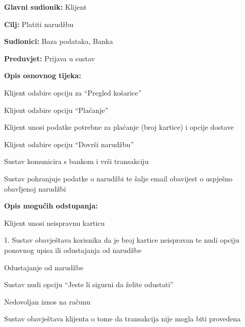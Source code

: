 				\noindent {}
				\begin{packed_item}
					
					\item \textbf{Glavni sudionik: } Klijent
					\item  \textbf{Cilj:} Platiti narudžbu 
					\item  \textbf{Sudionici:} Baza podataka, Banka
					\item  \textbf{Preduvjet:}  Prijava u sustav
					\item  \textbf{Opis osnovnog tijeka:}
					
					\item[] \begin{packed_enum}
						\item Klijent odabire opciju za “Pregled košarice”
						\item Klijent odabire opciju “Plaćanje”
						\item Klijent unosi podatke potrebne za plaćanje (broj kartice) i opcije dostave
						\item Klijent odabire opciju “Dovrši narudžbu”
						\item Sustav komunicira s bankom i vrši transakciju
						\item Sustav pohranjuje podatke o narudžbi te šalje email obavijest o uspješno obavljenoj narudžbi
					\end{packed_enum}
					\item  \textbf{Opis mogućih odstupanja:}
					\item[] \begin{packed_item}
						\item[3.a]      Klijent unosi neispravnu karticu
						\item[] \begin{packed_enum}
							\item         1. Sustav obavještava korisnika da je broj kartice neispravan te nudi opciju ponovnog upisa ili odustajanja od narudžbe
						\end{packed_enum}
						
						\item[4.a]      Odustajanje od narudžbe
						\item[] \begin{packed_enum}
							\item         Sustav nudi opciju “Jeste li sigurni da želite odustati”
						\end{packed_enum}
						\item[5.a]  Nedovoljan iznos na računu
						\item[] \begin{packed_enum}
							\item         Sustav obavještava klijenta o tome da transakcija nije mogla biti provedena
						\end{packed_enum}
					\end{packed_item}
				\end{packed_item}
				
